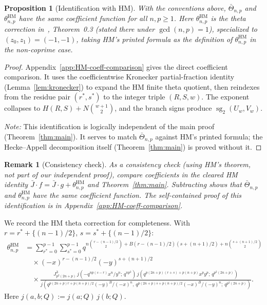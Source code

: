 \documentclass[11pt]{article}
\newtheorem{proposition}[theorem]{Proposition}
\newtheorem{remark}[theorem]{Remark}
\newcommand{\sgtwo}{\operatorname{sg}_2}
\begin{document}
\begin{proposition}[Identification with HM]\label{prop:HM}
With the conventions above, $\bar\Theta_{n,p}$ and
$\theta_{n,p}^{\mathrm{HM}}$ have the same coefficient function for all
$n,p\ge 1$.  Here $\theta_{n,p}^{\mathrm{HM}}$ is the theta correction
in~\cite{jHiMo14}, Theorem~0.3 (stated there under
$\gcd(n,p)=1$), specialized to $(z_0,z_1)=(-1,-1)$,
taking HM's printed formula as the definition of
$\theta_{n,p}^{\mathrm{HM}}$ in the non-coprime case.
\end{proposition}

\begin{proof}
Appendix~\ref{app:HM-coeff-comparison} gives the direct
coefficient comparison.  It uses the coefficientwise Kronecker
partial-fraction identity (Lemma~\ref{lem:kronecker}) to
expand the HM finite theta quotient, then reindexes from the
residue pair $(r^*,s^*)$ to the integer triple $(R,S,w)$.
The exponent collapses to $H(R,S)+N\binom{w+1}{2}$,
and the branch signs produce $\sgtwo(U_w,V_w)$.

\emph{Note:} This identification is logically independent of
the main proof (Theorem~\ref{thm:main}).  It serves to match
$\bar\Theta_{n,p}$ against HM's printed formula; the
Hecke--Appell decomposition itself (Theorem~\ref{thm:main})
is proved without it.
\end{proof}

\begin{remark}[Consistency check]
As a consistency check (using HM's theorem, not part of our
independent proof), compare coefficients in the cleared HM identity
$\bar{J}\cdot f=\bar{J}\cdot g+\theta_{n,p}^{\mathrm{HM}}$
and Theorem~\ref{thm:main}.  Subtracting shows that
$\bar\Theta_{n,p}$ and $\theta_{n,p}^{\mathrm{HM}}$ have the same
coefficient function.
The self-contained proof of this identification is in
Appendix~\ref{app:HM-coeff-comparison}.
\end{remark}

We record the HM theta correction for completeness.  With
$r=r^*+\{(n-1)/2\}$, $s=s^*+\{(n-1)/2\}$:
\begin{align*}
\theta_{n,p}^{\mathrm{HM}}&=\sum_{r^*=0}^{p-1}\sum_{s^*=0}^{p-1}
 q^{n\binom{r-(n-1)/2}{2}+B(r-(n-1)/2)(s+(n+1)/2)+n\binom{s+(n+1)/2}{2}}\\
&\quad\times(-x)^{r-(n-1)/2}(-y)^{s+(n+1)/2}\\
&\quad\times
\frac{J_{p^2(2n+p)}^3\,
  j(-q^{np(s-r)}x^n/y^n;\,q^{np^2})\,
  j(q^{p(2n+p)(r+s)+p(n+p)}x^py^p;\,q^{p^2(2n+p)})}
  {j(q^{p(2n+p)r+p(n+p)/2}(-y)^B/(-x)^n,\,
     q^{p(2n+p)s+p(n+p)/2}(-x)^B/(-y)^n;\,q^{p^2(2n+p)})}.
\end{align*}
Here $j(a,b;Q):=j(a;Q)\,j(b;Q)$.
\end{document}
